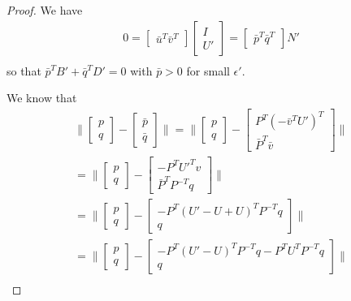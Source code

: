 \begin{proof}

We have
\begin{align*}
0 = \begin{bmatrix}{\bar u}^T {\bar v}^T\end{bmatrix} \begin{bmatrix}I \\ U'\end{bmatrix}
= \begin{bmatrix}{\bar p}^T {\bar q}^T\end{bmatrix} N' \\
\end{align*}
so that $\bar{p}^TB' + \bar{q}^T D'  = 0$ with $\bar p > 0$ for small $\epsilon'$.

We know that
\begin{align*}
\bigg\|\begin{bmatrix}{ p} \\ { q}\end{bmatrix} - \begin{bmatrix}{\bar p} \\ {\bar q}\end{bmatrix} \bigg\| =
\bigg\|\begin{bmatrix}{ p} \\ { q}\end{bmatrix} - \begin{bmatrix}{P^T(-\bar v^TU')^T} \\ {\bar P^T\bar v}\end{bmatrix} \bigg\| \\
= \bigg\|\begin{bmatrix}{ p} \\ { q}\end{bmatrix} - \begin{bmatrix}{-P^TU'^Tv} \\ {\bar P^TP^{-T}q}\end{bmatrix} \bigg\| \\
= \bigg\|\begin{bmatrix}{ p} \\ { q}\end{bmatrix} - \begin{bmatrix}{-P^T(U' - U + U)^TP^{-T}q} \\ {q}\end{bmatrix} \bigg\| \\
= \bigg\|\begin{bmatrix}{ p} \\ { q}\end{bmatrix} - \begin{bmatrix}{-P^T(U' - U)^T P^{-T}q -P^T U^T P^{-T}q} \\ {q}\end{bmatrix} \bigg\| \\

\end{align*}
\end{proof}
